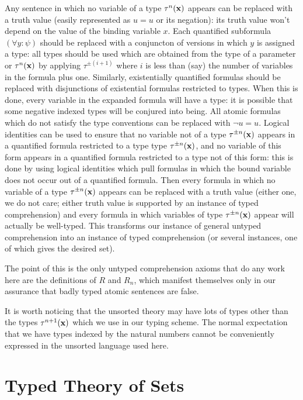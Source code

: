 \documentclass[12pt]{book}
\begin{document}
Any sentence in which no variable of a type $\tau^n({\bf x})$ appears can be replaced with a truth value (easily represented as $u=u$ or its negation):  its truth value won't
depend on the value of the binding variable $x$.  Each quantified subformula $(\forall y:\psi)$ should be replaced with a conjuncton of versions in which $y$ is assigned a type:  all types should be used which are obtained from the type of a parameter or $\tau^n({\bf x})$ by applying $\tau^{\pm(i+1)}$ where $i$ is less than (say) the number of variables in the formula plus one.  Similarly, existentially quantified formulas should be replaced with disjunctions of  existential formulas restricted to types.  When this is done, every variable in the expanded formula will have a type:  it is possible that some negative indexed types will be conjured into being.  All atomic formulas which do not satisfy the type conventions can be replaced with $\neg u=u$.
Logical identities can be used to ensure that no variable not of a type $\tau^{\pm n}({\bf x})$ appears in a quantified formula restricted to a type  type $\tau^{\pm n}({\bf x})$,
and no variable of this form appears in a quantified formula restricted to a type not of this form:  this is done by using logical identities which pull formulas in which the bound variable does not occur out of a quantified formula.  Then every formula in which  no variable of a type $\tau^{\pm n}({\bf x})$ appears can be replaced with a truth value (either one, we do not care;
either truth value is supported by an instance of typed comprehension) and every formula in which variables of  type $\tau^{\pm n}({\bf x})$ appear will actually be well-typed.  This transforms our instance of general untyped comprehension into an instance of typed comprehension (or several instances, one of which gives the desired set).

The point of this is the only untyped comprehension axioms that do any work here are the definitions of $R$ and $R_n$, which manifest themselves only in our assurance that
badly typed atomic sentences are false.

It is worth noticing that the unsorted theory may have lots of types other than the types $\tau^{n+1}({\bf x})$ which we use in our typing scheme.  The normal expectation that we have types indexed by the natural numbers cannot be conveniently expressed in the unsorted language used here.

\section{Typed Theory of Sets}
\end{document}
